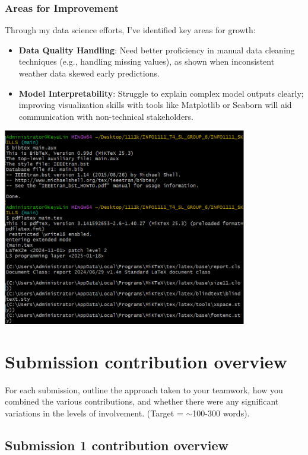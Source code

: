 \documentclass[a4paper, 11pt]{report}
\begin{document}
\subsubsection*{Areas for Improvement}
Through my data science efforts, I’ve identified key areas for growth:
\begin{itemize}
    \item \textbf{Data Quality Handling}: Need better proficiency in manual data cleaning techniques (e.g., handling missing values), as shown when inconsistent weather data skewed early predictions.
    \item \textbf{Model Interpretability}: Struggle to explain complex model outputs clearly; improving visualization skills with tools like Matplotlib or Seaborn will aid communication with non-technical stakeholders.
\end{itemize}
\begin{center}
\includegraphics[width=0.8\textwidth]{link/44.png}
\end{center}


\newpage

\section{Submission contribution overview}

For each submission, outline the approach taken to your teamwork, how you combined the various contributions, and whether there were any significant variations in the levels of involvement. (Target = $\sim$100-300 words).

\subsection{Submission 1 contribution overview}
\end{document}
